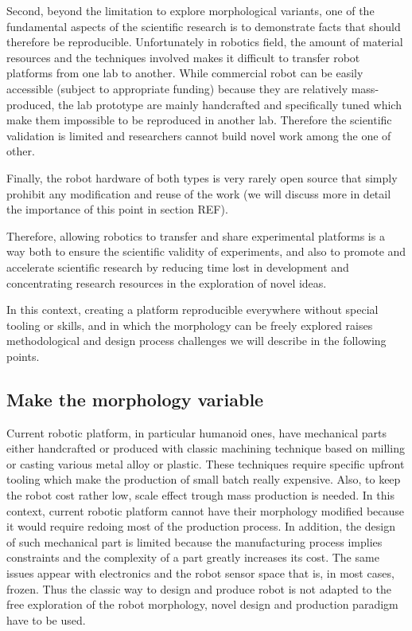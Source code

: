 Second, beyond the limitation to explore morphological variants, one of the fundamental aspects of the scientific research is to demonstrate facts that should therefore be reproducible. Unfortunately in robotics field, the amount of material resources and the techniques involved makes it difficult to transfer robot platforms from one lab to another. While commercial robot can be easily accessible (subject to appropriate funding) because they are relatively mass-produced, the lab prototype are mainly handcrafted and specifically tuned which make them impossible to be reproduced in another lab. Therefore the scientific validation is limited and researchers cannot build novel work among the one of other.

Finally, the robot hardware of both types is very rarely open source that simply prohibit any modification and reuse of the work (we will discuss more in detail the importance of this point in section REF).

Therefore, allowing robotics to transfer and share experimental platforms is a way both to ensure the scientific validity of experiments, and also to promote and accelerate scientific research by reducing time lost in development and concentrating research resources in the exploration of novel ideas.


In this context, creating a platform reproducible everywhere without special tooling or skills, and in which the morphology can be freely explored raises methodological and design process challenges we will describe in the following points.

\subsection{Make the morphology variable} %

Current robotic platform, in particular humanoid ones, have mechanical parts either handcrafted or produced with classic machining technique based on milling or casting various metal alloy or plastic.
These techniques require specific upfront tooling which make the production of small batch really expensive. Also, to keep the robot cost rather low, scale effect trough mass production is needed. In this context, current robotic platform cannot have their morphology modified because it would require redoing most of the production process. In addition, the design of such mechanical part is limited because the manufacturing process implies constraints and the complexity of a part greatly increases its cost. The same issues appear with electronics and the robot sensor space that is, in most cases, frozen. Thus the classic way to design and produce robot is not adapted to the free exploration of the robot morphology, novel design and production paradigm have to be used.


